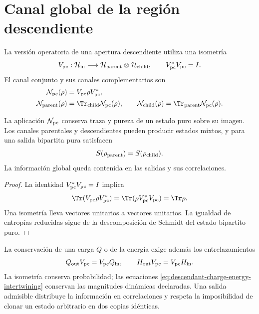 \section{Canal global de la regi\'on descendiente}

La versi\'on operatoria de una apertura descendiente utiliza una isometr\'ia
\begin{equation}
 V_{\rm pc}:\mathcal H_{\rm in}\longrightarrow
 \mathcal H_{\rm parent}\otimes\mathcal H_{\rm child},
 \qquad
 V_{\rm pc}^*V_{\rm pc}=I.
 \label{eq:descendant-parent-child-isometry}
\end{equation}
El canal conjunto y sus canales complementarios son
\begin{align}
 \mathcal N_{\rm pc}(\rho)
 &=V_{\rm pc}\rho V_{\rm pc}^*,
 \label{eq:descendant-global-channel}\\
 \mathcal N_{\rm parent}(\rho)
 &=\Tr_{\rm child}\mathcal N_{\rm pc}(\rho),
 \qquad
 \mathcal N_{\rm child}(\rho)
 =\Tr_{\rm parent}\mathcal N_{\rm pc}(\rho).
 \label{eq:descendant-complementary-channels}
\end{align}

\begin{theorem}
\label{thm:descendant-global-conservation}
La aplicaci\'on \(\mathcal N_{\rm pc}\) conserva traza y pureza de un estado
puro sobre su imagen. Los canales parentales y descendientes pueden producir
estados mixtos, y para una salida bipartita pura satisfacen
\begin{equation}
 S(\rho_{\rm parent})=S(\rho_{\rm child}).
 \label{eq:descendant-equal-entanglement}
\end{equation}
La informaci\'on global queda contenida en las salidas y sus correlaciones.
\end{theorem}

\begin{proof}
La identidad \(V_{\rm pc}^*V_{\rm pc}=I\) implica
\[
 \Tr(V_{\rm pc}\rho V_{\rm pc}^*)
 =\Tr(\rho V_{\rm pc}^*V_{\rm pc})=\Tr\rho.
\]
Una isometr\'ia lleva vectores unitarios a vectores unitarios. La igualdad de
entrop\'ias reducidas sigue de la descomposici\'on de Schmidt del estado
bipartito puro.
\end{proof}

La conservaci\'on de una carga \(Q\) o de la energ\'ia exige adem\'as los
entrelazamientos
\begin{equation}
 Q_{\rm out}V_{\rm pc}=V_{\rm pc}Q_{\rm in},
 \qquad
 H_{\rm out}V_{\rm pc}=V_{\rm pc}H_{\rm in}.
 \label{eq:descendant-charge-energy-intertwining}
\end{equation}
La isometr\'ia conserva probabilidad; las ecuaciones
\cref{eq:descendant-charge-energy-intertwining} conservan las magnitudes
din\'amicas declaradas. Una salida admisible distribuye la informaci\'on en
correlaciones y respeta la imposibilidad de clonar un estado arbitrario en
dos copias id\'enticas.

